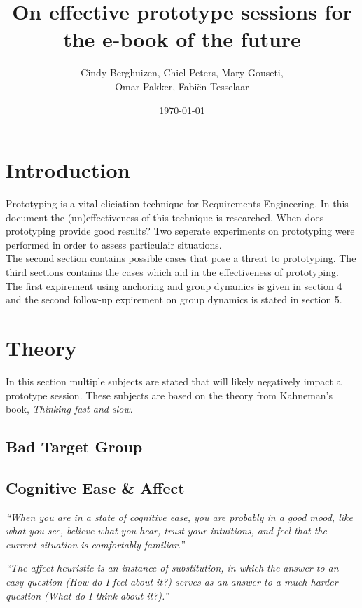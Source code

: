 \documentclass{article}
\title{On effective prototype sessions for the e-book of the future}
\author{Cindy Berghuizen, Chiel Peters, Mary Gouseti,\\ Omar Pakker, Fabi\"en Tesselaar}
\date{\today}
\begin{document}
\maketitle

\section{Introduction}
Prototyping is a vital eliciation technique for Requirements Engineering. In this document the (un)effectiveness of this technique is researched. When does prototyping provide good results? Two seperate experiments on prototyping were performed in order to assess particulair situations. \\

The second section contains possible cases that pose a threat to prototyping. The third sections contains the cases which aid in the effectiveness of prototyping. The first expirement using anchoring and group dynamics is given in section 4 and the second follow-up expirement on group dynamics is stated in section 5.


\section{Theory}
In this section multiple subjects are stated that will likely negatively impact a prototype session. These subjects are based on the theory from Kahneman's book, \emph{Thinking fast and slow}.

\subsection{Bad Target Group}

\subsection{Cognitive Ease \& Affect}
\emph{``When you are in a state of cognitive ease, you are probably in a good mood, like what you see, believe what you hear, trust your intuitions, and feel that the current situation is comfortably familiar.''}

\emph{``The affect heuristic is an instance of substitution, in which the answer to an easy question (How do I feel about it?) serves as an answer to a much harder question (What do I think about it?).''}
\end{document}
